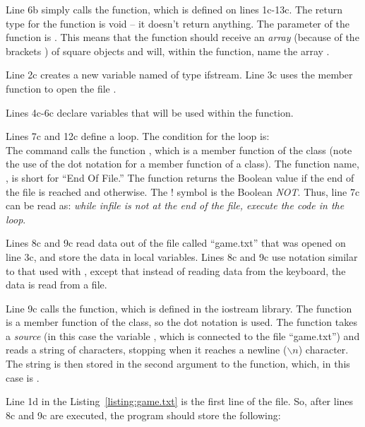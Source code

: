 Line 6b simply calls the  function, which is defined on lines 1c-13c.   The return type for the function is void -- it doesn't return anything.  The parameter of the function is .  This means that the function should receive an \emph{array} (because of the brackets \cf{[]}) of square objects and will, within the function, name the array .  

Line 2c creates a new variable named  of type ifstream.  Line 3c uses the  member function to open the file . 

Lines 4c-6c declare variables that will be used within the  function. 

Lines 7c and 12c define a  loop. The condition for the loop is:
\\
The command  calls the function , which is a member function of the class  (note the use of the dot notation for a member function of a class).  The function name, , is short for ``End Of File.''  The function  returns the Boolean value  if the end of the file is reached and  otherwise.  The ! symbol is the Boolean \emph{NOT}.  Thus, line 7c can be read as:
\emph{while infile is not at the end of the file, execute the code in the loop}.

Lines 8c and 9c read data out of the file called ``game.txt'' that was opened on line 3c, and store the data in local variables.  Lines 8c and 9c use notation similar to that used with , except that instead of reading data from the keyboard, the data is read from a file.  

Line 9c calls the  function, which is defined in the iostream library.  The function  is a member function of the  class, so the dot notation is used.  The function takes a \emph{source} (in this case the variable , which is connected to the file ``game.txt'') and reads a string of characters, stopping when it reaches a newline ($\backslash n$) character.  The string is then stored in the second argument to the  function, which, in this case is .

Line 1d in the Listing~\ref{listing:game.txt} is the first line of the  file.  So, after lines 8c and 9c are executed, the program should store the following:\\
\\
\\
\\
\\

